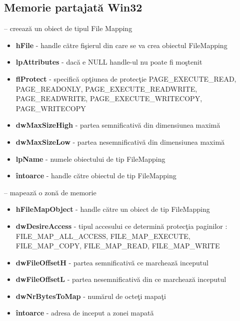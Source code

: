 \documentclass{refcard.cs.pub.ro}
\begin{document}
\begin{multicols*}{3}
\vspace*{-0.3cm}
\section{ Memorie partajată Win32}

 -- creează un obiect de tipul File Mapping
\begin{itemize}
  \item \textbf{hFile} - handle către fişierul din care se va crea obiectul FileMapping
  \item \textbf{lpAttributes} -  dacă e NULL handle-ul nu poate fi moştenit
  \item \textbf{flProtect} - specifică opţiunea de protecţie
 PAGE_EXECUTE_READ, PAGE_READONLY, PAGE_EXECUTE_READWRITE, PAGE_READWRITE, PAGE_EXECUTE_WRITECOPY, PAGE_WRITECOPY
  \item \textbf{dwMaxSizeHigh} - partea semnificativă din dimensiunea maximă
  \item \textbf{dwMaxSizeLow} - partea nesemnificativă din dimensiunea maximă
  \item \textbf{lpName} - numele obiectului de tip FileMapping
  \item \textbf{întoarce} - handle către obiectul de tip FileMapping
\end{itemize}

 -- mapează o zonă de memorie
\begin{itemize}
  \item \textbf{hFileMapObject} - handle către un obiect de tip FileMapping
  \item \textbf{dwDesireAccess} - tipul accesului ce determină protecţia paginilor :  
 FILE_MAP_ALL_ACCESS, FILE_MAP_EXECUTE, FILE_MAP_COPY, FILE_MAP_READ, FILE_MAP_WRITE
  \item \textbf{dwFileOffsetH} - partea semnificativă ce marchează inceputul
  \item \textbf{dwFileOffsetL} - partea nesemnificativă din ce marchează inceputul
  \item \textbf{dwNrBytesToMap} - numărul de octeţi mapaţi
  \item \textbf{întoarce} - adresa de inceput a zonei mapată
\end{itemize}


\end{multicols*}
\end{document}
